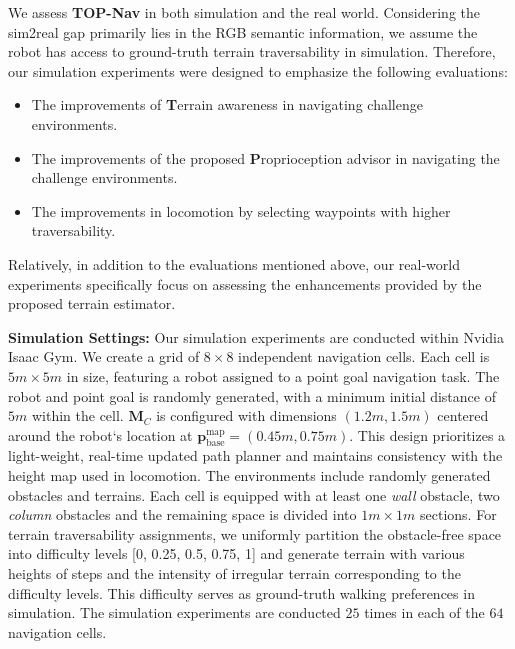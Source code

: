 \documentclass[conference]{IEEEtran}
\begin{document}
We assess \textbf{TOP-Nav} in both simulation and the real world. Considering the sim2real gap primarily lies in the RGB semantic information, we assume the robot has access to ground-truth terrain traversability in simulation. Therefore, our simulation experiments were designed to emphasize the following evaluations:

\begin{itemize}
    \item The improvements of \textbf{T}errain awareness in navigating challenge environments.
    \item The improvements of the proposed \textbf{P}roprioception advisor in navigating the challenge environments.
    \item The improvements in locomotion by selecting waypoints with higher traversability.
\end{itemize}

Relatively, in addition to the evaluations mentioned above, our real-world experiments specifically focus on assessing the enhancements provided by the proposed terrain estimator.

\noindent\textbf{Simulation Settings:} Our simulation experiments are conducted within Nvidia Isaac Gym. We create a grid of ${8 \times 8}$ independent navigation cells. Each cell is ${5m \times 5m}$ in size, featuring a robot assigned to a point goal navigation task. The robot and point goal is randomly generated, with a minimum initial distance of ${5m}$ within the cell. $\bm{M}_C$ is configured with dimensions $(1.2m, 1.5m)$ centered around the robot`s location at ${\bm{p}_\textrm{base}^\textrm{map}=(0.45m,0.75m)}$. This design prioritizes a light-weight, real-time updated path planner and maintains consistency with the height map used in locomotion. The environments include randomly generated obstacles and terrains. Each cell is equipped with at least one \emph{wall} obstacle, two \emph{column} obstacles and the remaining space is divided into ${1m \times 1m}$ sections. For terrain traversability assignments, we uniformly partition the obstacle-free space into difficulty levels [0, 0.25, 0.5, 0.75, 1] and generate terrain with various heights of steps and the intensity of irregular terrain corresponding to the difficulty levels. This difficulty serves as ground-truth walking preferences in simulation. The simulation experiments are conducted $25$ times in each of the $64$ navigation cells.
\end{document}

